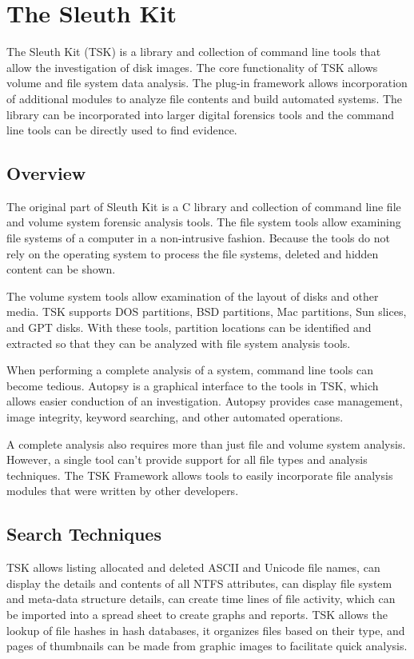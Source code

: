 \section{The Sleuth Kit}

The Sleuth Kit (TSK) is a library and collection of command line tools that allow the
investigation of disk images. The core functionality of TSK allows volume and file system data analysis.
The plug-in framework allows incorporation of additional modules to analyze file contents
and build automated systems. The library can be incorporated into larger digital forensics tools and
the command line tools can be directly used to find evidence.

\subsection{Overview}

The original part of Sleuth Kit is a C library and collection of command line
file and volume system forensic analysis tools. The file system tools allow examining file systems
of a computer in a non-intrusive fashion. Because the tools do not rely on the operating system to process
the file systems, deleted and hidden content can be shown.

The volume system tools allow examination of the layout of disks
and other media. TSK supports DOS partitions, BSD partitions, Mac partitions, Sun slices, and 
GPT disks. With these tools, partition locations can be identified 
and extracted so that they can be analyzed with file system analysis tools.

When performing a complete analysis of a system, command line 
tools can become tedious. Autopsy is a graphical interface to the tools in TSK, 
which allows easier conduction of an investigation. Autopsy 
provides case management, image integrity, keyword searching, and other automated
operations.

A complete analysis also requires more than just file and volume system analysis.
However, a single tool can't provide support for all file types and analysis 
techniques. The TSK Framework allows tools to easily incorporate file analysis
modules that were written by other developers.

\subsection{Search Techniques}

TSK allows listing allocated and deleted ASCII and Unicode file names, can display the
details and contents of all NTFS attributes, can display file system and meta-data structure details,
can create time lines of file activity, which can be imported into a spread sheet to create graphs and reports.
TSK allows the lookup of file hashes in hash databases, it organizes files based on their type, and pages of
thumbnails can be made from graphic images to facilitate quick analysis.

